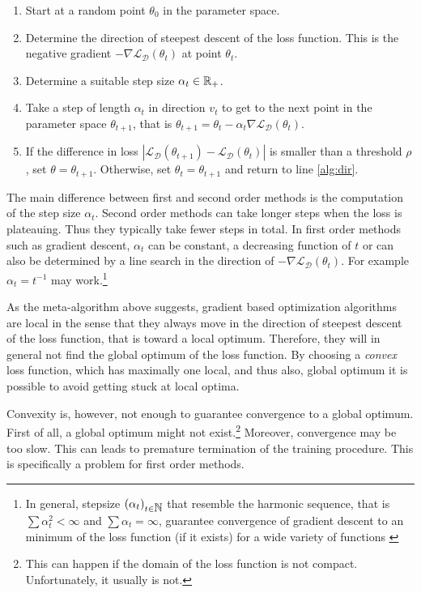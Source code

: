\begin{enumerate}
\item Start at a random point $\theta_0$ in the parameter space.
\item Determine the direction of steepest descent of the loss
function. This is the negative gradient $-\nabla
\mathcal{L}_{\mathcal{D}}(\theta_t)$ at point $\theta_t$.\label{alg:dir}
\item Determine a suitable step size $\alpha_t \in \mbox{$\mathbb R$}_+$.
\item Take a step of length $\alpha_t$ in direction $v_t$ to get to
the next point in the parameter space $\theta_{t+1}$, that is
$\theta_{t+1} = \theta_t - \alpha_t \nabla \mathcal{L}_{\mathcal{D}}(\theta_t)$.
\item If the difference in loss $|\mathcal{L}_{\mathcal{D}}(\theta_{t+1}) -
\mathcal{L}_{\mathcal{D}}(\theta_t)|$ is smaller than a threshold $\rho$, set
$\theta = \theta_{t+1}$. Otherwise, set $\theta_t = \theta_{t+1}$ and
return to line \ref{alg:dir}.
\end{enumerate}

The main difference between first and second order methods is the
computation of the step size $\alpha_t$. Second order methods can take
longer steps when the loss is plateauing. Thus they typically take
fewer steps in total. In first order methods such as gradient descent,
$\alpha_t$ can be constant, a decreasing function of $t$ or can also
be determined by a line search in the direction of $-\nabla
\mathcal{L}_{\mathcal{D}}(\theta_t)$. For example $\alpha_t =
t^{-1}$ may work.\footnote{In general, stepsize $(\alpha_t)_{t \in
\mbox{$\mathbb N$}}$ that resemble the harmonic sequence, that is $\sum \alpha_t^2 <
\infty$ and $\sum \alpha_t = \infty$, guarantee convergence of
gradient descent to an minimum of the loss function (if it exists) for
a wide variety of functions \cite{someone}}


As the meta-algorithm above suggests, gradient based optimization
algorithms are local in the sense that they always move in the
direction of steepest descent of the loss function, that is toward a
local optimum. Therefore, they will in general not find the global
optimum of the loss function. By choosing a {\it convex} loss
function, which has maximally one local, and thus also, global optimum it
is possible to avoid getting stuck at local optima.

Convexity is, however, not enough to guarantee convergence to a global
optimum. First of all, a global optimum might not exist.\footnote{This
can happen if the domain of the loss function is not
compact. Unfortunately, it usually is not.} Moreover, convergence may be
too slow. This can leads to premature termination of the training
procedure. This is specifically a problem for first order methods.

